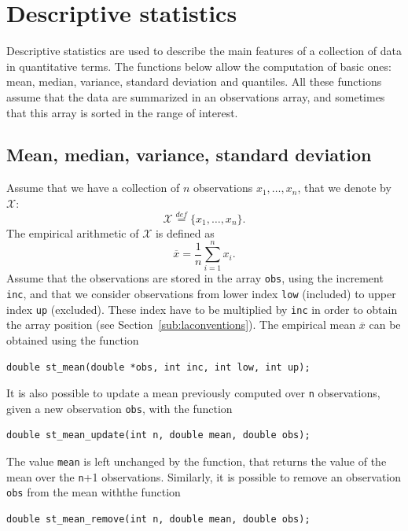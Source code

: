 \section{Descriptive statistics}

Descriptive statistics are used to describe the main features of a
collection of data in quantitative terms.
The functions below allow the computation of basic ones: mean, median,
variance, standard deviation and quantiles.
All these functions assume that the data are summarized in an
observations array, and sometimes that this array is sorted in the
range of interest.

\subsection{Mean, median, variance, standard deviation}

Assume that we have a collection of $n$ observations $x_1,\ldots,x_n$,
that we denote by $\mathcal{X}$:
\[
\mathcal{X} \overset{def}{=} \lbrace x_1,\ldots,x_n \rbrace.
\]
The empirical arithmetic  of $\mathcal{X}$ is defined as
\[
\overline{x} = \frac{1}{n} \sum_{i = 1}^n x_i.
\]
Assume that the observations are stored in the array \verb|obs|,
using the increment \verb|inc|, and that we consider observations from
lower index \verb|low| (included) to upper index \verb|up| (excluded).
These index have to be multiplied by \verb|inc| in order to obtain the
array position (see Section~\ref{sub:laconventions}).
The empirical mean $\overline{x}$ can be obtained using the function
\begin{verbatim}
double st_mean(double *obs, int inc, int low, int up);
\end{verbatim}
It is also possible to update a mean previously computed over \verb|n| observations, given a new observation \verb|obs|, with the function
\begin{verbatim}
double st_mean_update(int n, double mean, double obs);
\end{verbatim}
The value \verb|mean| is left unchanged by the function, that returns the value of the mean over the \verb|n|+1 observations.
Similarly, it is possible to remove an observation \verb|obs| from the mean withthe function 
\begin{verbatim}
double st_mean_remove(int n, double mean, double obs);
\end{verbatim}

